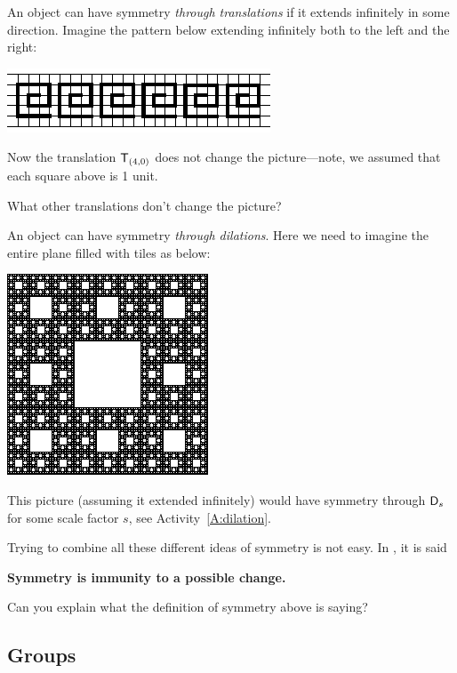 \documentclass{ximera}
\begin{document}
An object can have symmetry \textit{through translations} if it
extends infinitely in some direction.  Imagine the pattern
below extending infinitely both to the left and the right:
\begin{image}
\includegraphics{fpGraphEx1.pdf}
\end{image}
Now the translation $\mathsf{T}_{(4,0)}$ does not change the
picture---note, we assumed that each square above is 1 unit.

\begin{question}
What other translations don't change the picture?
\end{question}



An object can have symmetry \textit{through dilations}.  Here we need
to imagine the entire plane filled with tiles as below:
\begin{image}
\includegraphics{sierpinskiCarpet.pdf}
\end{image}
This picture (assuming it extended infinitely) would have symmetry
through $\mathsf{D}_s$ for some scale factor $s$, see Activity~\ref{A:dilation}.


Trying to combine all these different ideas of symmetry is not easy.
In \cite{rosen}, it is said
\begin{center}
\textbf{Symmetry is immunity to a possible change.}
\end{center}

\begin{question}
Can you explain what the definition of symmetry above is saying?
\end{question}


\subsection{Groups}
\end{document}
